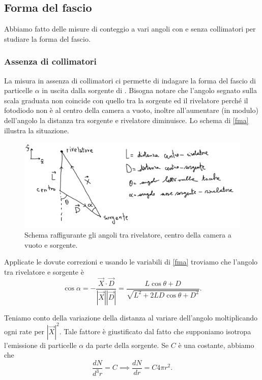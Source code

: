 \subsection{Forma del fascio}

Abbiamo fatto delle misure di conteggio a vari angoli con e senza collimatori per studiare la forma del fascio.

\subsubsection{Assenza di collimatori}

La misura in assenza di collimatori ci permette di indagare la forma del fascio di particelle $\alpha$ in uscita dalla sorgente di \am{}.
Bisogna notare che l'angolo segnato sulla scala graduata non coincide con quello tra la sorgente ed il rivelatore perché il fotodiodo non è al centro della camera a vuoto, inoltre all'aumentare (in modulo) dell'angolo la distanza tra sorgente e rivelatore diminuisce. 
Lo schema di \autoref{fma} illustra la situazione.

\begin{figure}[h]
\centering
\includegraphics[width=30 em]{immagini/fma_provv}
\caption{Schema raffigurante gli angoli tra rivelatore, centro della camera a vuoto e sorgente.}
\label{fma}
\end{figure}

Applicate le dovute correzioni e usando le variabili di \autoref{fma} troviamo che l'angolo tra rivelatore e sorgente è
\begin{equation}
\cos{\alpha}= -\frac{\vec{X} \cdot \vec{D} }{ |\vec{X}| |\vec{D}| } = \frac{ L \cos{\theta} + D }{ \sqrt{ L^2+2LD\cos{\theta}+D^2  } }.
\end{equation}

Teniamo conto della variazione della distanza al variare dell'angolo moltiplicando ogni rate per $|\vec{X}|^2$.
Tale fattore è giustificato dal fatto che supponiamo isotropa l'emissione di particelle $\alpha$ da parte della sorgente.
Se $C$ è una costante, abbiamo che $$ \frac{dN}{d^3r}=C \implies \frac{dN}{dr}=C 4\pi r^2. $$

